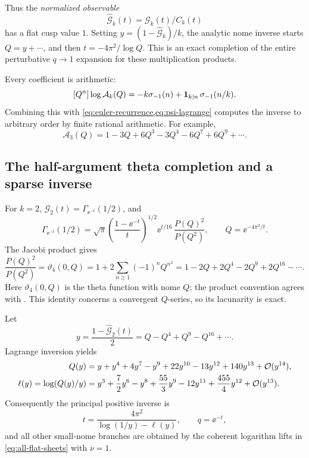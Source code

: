 Thus the \emph{normalized observable}
\[
 \widehat{\mathcal G}_k(t)=\mathcal G_k(t)/C_k(t)
\]
has a flat cusp value \(1\).
Setting
\(y=(1-\widehat{\mathcal G}_k)/k\), the analytic nome inverse
starts \(Q=y+\cdots\), and then
\(t=-4\pi^2/\log Q\).
This is an exact completion of the entire perturbative
\(q\to1\) expansion for these multiplication products.

Every coefficient is arithmetic:
\begin{equation}\label{eq:qgamma-lambda}
 [Q^n]\log\mathcal A_k(Q)
 =-k\sigma_{-1}(n)
   +{\bf1}_{k\mid n}\,\sigma_{-1}(n/k).
\end{equation}
Combining this with \cref{eq:euler-recurrence,eq:psi-lagrange}
computes the inverse to arbitrary order by finite rational
arithmetic.
For example,
\[
 \mathcal A_3(Q)=1-3Q+6Q^3-3Q^4-6Q^7+6Q^9+\cdots .
\]

\subsection{The half-argument theta completion and a sparse inverse}

For \(k=2\), \(\mathcal G_2(t)=\Gamma_{\ee^{-t}}(1/2)\), and
\begin{equation}\label{eq:qgamma-half}
 \Gamma_{\ee^{-t}}(1/2)
 =\sqrt{\pi}\left(\frac{1-\ee^{-t}}t\right)^{1/2}
   \ee^{t/16}\,
   \frac{P(Q)^2}{P(Q^2)},\qquad Q=\ee^{-4\pi^2/t}.
\end{equation}
The Jacobi product gives
\begin{equation}\label{eq:theta-completion}
 \frac{P(Q)^2}{P(Q^2)}
 =\vartheta_4(0,Q)
 =1+2\sum_{n\ge1}(-1)^nQ^{n^2}
 =1-2Q+2Q^4-2Q^9+2Q^{16}-\cdots .
\end{equation}
Here \(\vartheta_4(0,Q)\) is the theta function with nome \(Q\);
the product convention agrees with
\cite[Equation 20.5.4]{dlmf-theta}.
This identity concerns a convergent \(Q\)-series, so its
lacunarity is exact.

Let
\[
 y=\frac{1-\widehat{\mathcal G}_2(t)}2
   =Q-Q^4+Q^9-Q^{16}+\cdots .
\]
Lagrange inversion yields
\begin{align}
 Q(y)={}&y+y^4+4y^7-y^9+22y^{10}
            -13y^{12}+140y^{13}+\mathcal O(y^{14}),\label{eq:theta-inverse}\\
 \ell(y)=\log(Q(y)/y)
       ={}&y^3+\frac72y^6-y^8+\frac{55}{3}y^9
             -12y^{11}+\frac{455}{4}y^{12}
             +\mathcal O(y^{13}).\label{eq:theta-log-inverse}
\end{align}
Consequently the principal positive inverse is
\begin{equation}\label{eq:qgamma-normalized-inverse}
 t=\frac{4\pi^2}{\log(1/y)-\ell(y)},\qquad q=\ee^{-t},
\end{equation}
and all other small-nome branches are obtained by the coherent
logarithm lifts in \cref{eq:all-flat-sheets} with \(\nu=1\).


